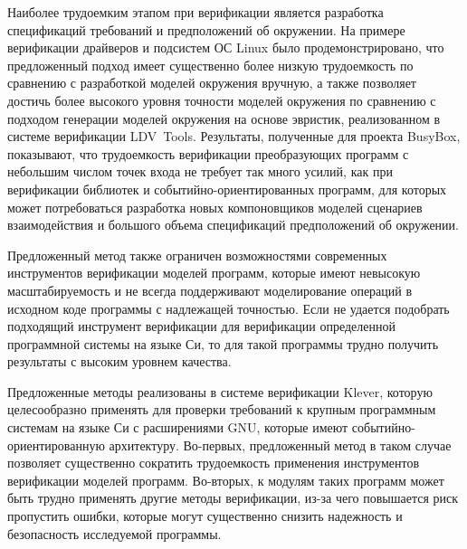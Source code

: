 Наиболее трудоемким этапом при верификации является разработка спецификаций требований и предположений об окружении.
На примере верификации драйверов и подсистем ОС Linux было продемонстрировано, что предложенный подход имеет существенно более низкую трудоемкость по сравнению с разработкой моделей окружения вручную, а также позволяет достичь более высокого уровня точности моделей окружения по сравнению с подходом генерации моделей окружения на основе эвристик, реализованном в системе верификации LDV~Tools.
Результаты, полученные для проекта BusyBox, показывают, что трудоемкость верификации преобразующих программ с небольшим числом точек входа не требует так много усилий, как при верификации библиотек и событийно-ориентированных программ, для которых может потребоваться разработка новых компоновщиков моделей сценариев взаимодействия и большого объема спецификаций предположений об окружении.

Предложенный метод также ограничен возможностями современных инструментов верификации моделей программ, которые имеют невысокую масштабируемость и не всегда поддерживают моделирование операций в исходном коде программы с надлежащей точностью.
Если не удается подобрать подходящий инструмент верификации для верификации определенной программной системы на языке Си, то для такой программы трудно получить результаты с высоким уровнем качества.

Предложенные методы реализованы в системе верификации Klever, которую целесообразно применять для проверки требований к крупным программным системам на языке Си с расширениями GNU, которые имеют событийно-ориентированную архитектуру.
Во-первых, предложенный метод в таком случае позволяет существенно сократить трудоемкость применения инструментов верификации моделей программ.
Во-вторых, к модулям таких программ может быть трудно применять другие методы верификации, из-за чего повышается риск пропустить ошибки, которые могут существенно снизить надежность и безопасность исследуемой программы.